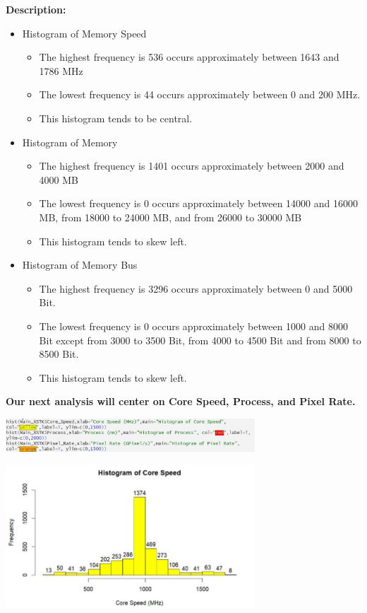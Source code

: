 \textbf{Description:}
\begin{itemize}
    \item Histogram of Memory Speed
    \begin{itemize}
        \item The highest frequency is 536 occurs approximately between 1643 and 1786 MHz
        \item The lowest frequency is 44 occurs approximately between 0 and 200 MHz.
        \item This histogram tends to be central.
    \end{itemize}

    \item Histogram of Memory
    \begin{itemize}
        \item The highest frequency is 1401 occurs approximately between 2000 and 4000 MB
        \item The lowest frequency is 0 occurs approximately between 14000 and 16000 MB, from 18000 to 24000 MB, and from 26000 to 30000 MB
        \item This histogram tends to skew left.
    \end{itemize}
    \item Histogram of Memory Bus
    \begin{itemize}
        \item The highest frequency is 3296 occurs approximately between 0 and 5000 Bit.
        \item The lowest frequency is 0 occurs approximately between 1000 and 8000 Bit except from 3000 to 3500 Bit, from 4000 to 4500 Bit and from 8000 to 8500 Bit.
        \item This histogram tends to skew left.
    \end{itemize}
    
\end{itemize}
\textbf{Our next analysis will center on Core Speed, Process, and Pixel Rate.}
\begin{center}
    \includegraphics[width=0.7\textwidth]{sk1.png}
\end{center}
\begin{center}
    \includegraphics[width=0.7\textwidth]{CSpeed.png}
\end{center}
